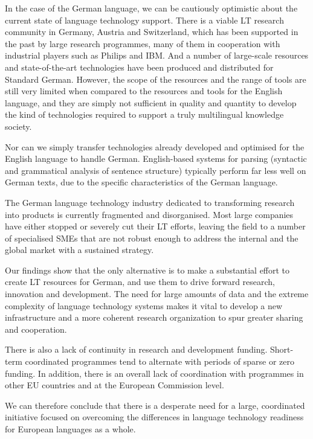 \documentclass[]{../metanetpaper}
\begin{document}
\begin{Parallel}[c]{80mm}{80mm}
{    In the case of the German language, we can be cautiously optimistic about the current state of language technology support. There is a viable LT research community in Germany, Austria and Switzerland, which has been supported in the past by large research programmes, many of them in cooperation with industrial players such as Philips and IBM. And a number of large-scale resources and state-of-the-art technologies have been produced and distributed for Standard German. However, the scope of the resources and the range of tools are still very limited when compared to the resources and tools for the English language, and they are simply not sufficient in quality and quantity to develop the kind of technologies required to support a truly multilingual knowledge society.

    Nor can we simply transfer technologies already developed and optimised for the English language to handle German. English-based systems for parsing (syntactic and grammatical analysis of sentence structure) typically perform far less well on German texts, due to the specific characteristics of the German language.

    The German language technology industry dedicated to transforming research into products is currently fragmented and disorganised. Most large companies have either stopped or severely cut their LT efforts, leaving the field to a number of specialised SMEs that are not robust enough to address the internal and the global market with a sustained strategy. 

    Our findings show that the only alternative is to make a substantial effort to create LT resources for German, and use them to drive forward research, innovation and development. The need for large amounts of data and the extreme complexity of language technology systems makes it vital to develop a new infrastructure and a more coherent research organization to spur greater sharing and cooperation.

    There is also a lack of continuity in research and development funding. Short-term coordinated programmes tend to alternate with periods of sparse or zero funding. In addition, there is an overall lack of coordination with programmes in other EU countries and at the European Commission level.

    We can therefore conclude that there is a desperate need for a large, coordinated initiative focused on overcoming the differences in language technology readiness for European languages as a whole.

}
\end{Parallel}
\end{document}
